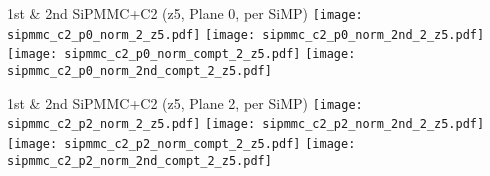 \documentclass{beamer}
\begin{document}
\begin{frame}{1st \& 2nd SiPMMC+C2 (z5, Plane 0, per SiMP)}
	\texttt{[image: sipmmc\_c2\_p0\_norm\_2\_z5.pdf]}
	\texttt{[image: sipmmc\_c2\_p0\_norm\_2nd\_2\_z5.pdf]} \\
	
		\texttt{[image: sipmmc\_c2\_p0\_norm\_compt\_2\_z5.pdf]}
		\texttt{[image: sipmmc\_c2\_p0\_norm\_2nd\_compt\_2\_z5.pdf]}
\end{frame}

\begin{frame}{1st \& 2nd SiPMMC+C2 (z5, Plane 2, per SiMP)}
	\texttt{[image: sipmmc\_c2\_p2\_norm\_2\_z5.pdf]}
	\texttt{[image: sipmmc\_c2\_p2\_norm\_2nd\_2\_z5.pdf]} \\
	
	\texttt{[image: sipmmc\_c2\_p2\_norm\_compt\_2\_z5.pdf]}
	\texttt{[image: sipmmc\_c2\_p2\_norm\_2nd\_compt\_2\_z5.pdf]}
\end{frame}


 
\end{document}
